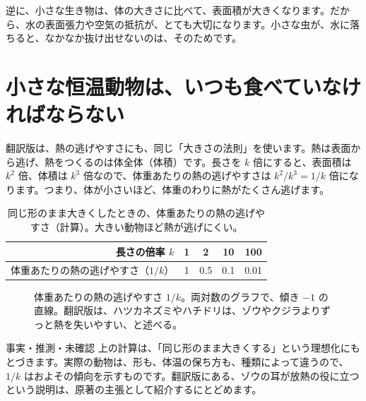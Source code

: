 \documentclass[a4paper,11pt,openany]{ltjsbook}
\begin{document}
逆に、小さな生き物は、体の大きさに比べて、表面積が大きくなります。だから、水の表面張力や空気の抵抗が、とても大切になります。小さな虫が、水に落ちると、なかなか抜け出せないのは、そのためです。

\section{小さな恒温動物は、いつも食べていなければならない}

翻訳版は、熱の逃げやすさにも、同じ「大きさの法則」を使います。熱は表面から逃げ、熱をつくるのは体全体（体積）です。長さを $k$ 倍にすると、表面積は $k^2$ 倍、体積は $k^3$ 倍なので、体重あたりの熱の逃げやすさは $k^2/k^3=1/k$ 倍になります。つまり、体が小さいほど、体重のわりに熱がたくさん逃げます。

\begin{table}[htbp]
\centering
\begin{tabular}{r|cccc}
\toprule
長さの倍率 $k$ & 1 & 2 & 10 & 100\\
\midrule
体重あたりの熱の逃げやすさ（$1/k$） & 1 & 0.5 & 0.1 & 0.01\\
\bottomrule
\end{tabular}
\caption{同じ形のまま大きくしたときの、体重あたりの熱の逃げやすさ（計算）。大きい動物ほど熱が逃げにくい。}
\end{table}

\begin{figure}[htbp]
\centering
{}
\caption{体重あたりの熱の逃げやすさ $1/k$。両対数のグラフで、傾き $-1$ の直線。翻訳版は、ハツカネズミやハチドリは、ゾウやクジラよりずっと熱を失いやすい、と述べる。}
\end{figure}

\begin{notebox}{事実・推測・未確認}
上の計算は、「同じ形のまま大きくする」という理想化にもとづきます。実際の動物は、形も、体温の保ち方も、種類によって違うので、$1/k$ はおよその傾向を示すものです。翻訳版にある、ゾウの耳が放熱の役に立つという説明は、原著の主張として紹介するにとどめます。
\end{notebox}
\end{document}
